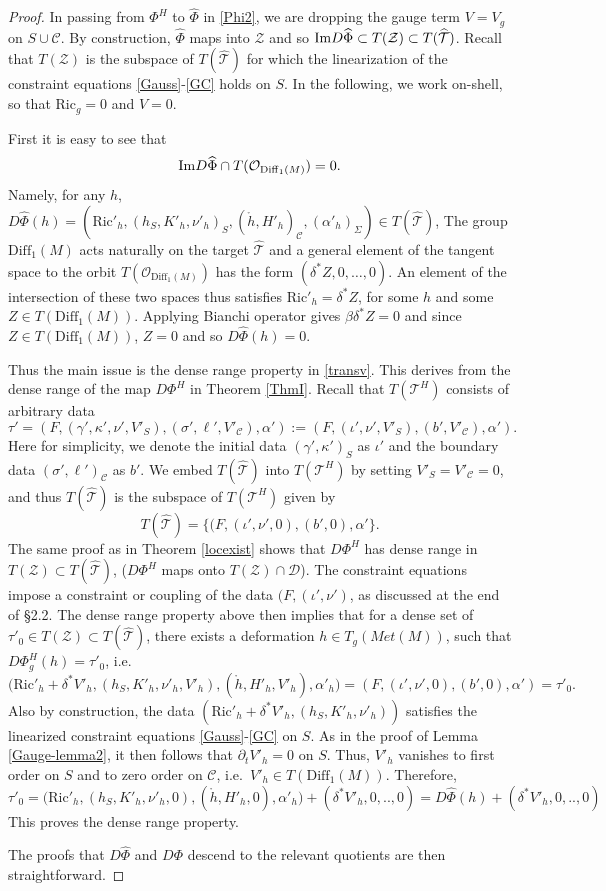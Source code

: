 \documentclass[10pt]{amsart}
\renewcommand{\a}{\alpha}
\renewcommand{\b}{\beta}
\newcommand{\g}{\gamma}
\renewcommand{\d}{\delta}
\newcommand{\s}{\sigma}
\newcommand{\Si}{\Sigma}
\renewcommand{\k}{\kappa}
\newcommand{\cO}{{\mathcal O}}
\newcommand{\cC}{{\mathcal C}}
\newcommand{\cT}{{\mathcal T}}
\newcommand{\cD}{{\mathcal D}}
\newcommand{\cZ}{\mathcal Z}
\newcommand{\Ric}{\mathrm{Ric}}
\newcommand{\Diff}{\mathrm{Diff}}
\newcommand{\bes}{\begin{equation*}}
\newcommand{\ees}{\end{equation*}}
\newcommand{\p}{\partial}
\renewcommand{\hat}{\widehat}
\newcommand{\<}{\langle}
\renewcommand{\>}{\rangle}
\theoremstyle{plain}
\theoremstyle{remark}
\theoremstyle{definition}
\numberwithin{equation}{section}
\begin{document}
\begin{proof}  

    In passing from $\Phi^H$ to $\hat \Phi$ in \eqref{Phi2}, we are dropping the gauge term $V = V_g$ on $S \cup \cC$. By construction, $\hat \Phi$ maps 
into $\cZ$ and so ${\rm Im}D\hat \Phi \subset T(\cZ) \subset T(\hat \cT)$. Recall that $T(\cZ)$ is the subspace of $T(\hat \cT)$ for which the 
linearization of the constraint equations \eqref{Gauss}-\eqref{GC} holds on $S$. In the following, we work on-shell, so that $\Ric_g = 0$ and $V = 0$. 

First it is easy to see that 
$${\rm Im}D\hat \Phi \cap T(\cO_{\Diff_1(M)}) = 0.$$
Namely, for any $h$, $D\hat \Phi(h) = (\Ric'_h, (h_S, K'_h, \nu'_h)_S, (\ring{h}, H'_h)_{\cC}, (\a'_h)_{\Si}) \in T(\hat \cT)$, The group 
$\Diff_1(M)$ acts naturally on the target $\hat \cT$ and a general element of the tangent space to the orbit $T(\cO_{\Diff_1(M)})$ has the form 
$(\d^*Z, 0, \dots, 0)$. An element of the intersection of these two spaces thus satisfies $\Ric'_h = \d^*Z$, for some $h$ and some 
$Z \in T(\Diff_1(M))$. Applying Bianchi operator gives $\b \d^*Z = 0$ and since $Z \in T(\Diff_1(M))$, $Z = 0$ and so $D\hat \Phi(h) = 0$. 

   Thus the main issue is the dense range property in \eqref{transv}. This derives from the dense range of the map $D\Phi^H$ in Theorem \ref{ThmI}.  
 Recall that $T(\cT^H)$ consists of arbitrary data 
$$\tau'= (F,(\g',\k',\nu',V'_S), (\s',\ell', V'_\cC), \a'):= (F,(\iota',\nu',V'_S), (b', V'_\cC), \a').$$
Here for simplicity, we denote the initial data $(\g',\k')_S$ as $\iota'$ and the boundary data $(\s',\ell')_\cC$ as $b'$. We embed $T(\hat \cT)$ into 
$T(\cT^H)$ by setting $V'_S=V'_\cC = 0$, and thus $T(\hat \cT)$ is the subspace of $T(\cT^H)$ given by 
$$T(\hat\cT) = \{ (F,(\iota',\nu',0), (b', 0), \a' \}.$$
The same proof as in Theorem \ref{locexist} shows that $D\Phi^H$ has dense range in $T(\cZ) \subset T(\hat \cT)$, ($D\Phi^H$ maps onto $T(\cZ) \cap \cD$). 
The constraint equations impose a constraint or coupling of the data $(F,(\iota',\nu')$, as discussed at the end of \S 2.2. The dense range property 
above then implies that for a dense set of $\tau'_0 \in T(\cZ) \subset T(\hat \cT)$, there exists a deformation $h \in T_g(Met(M))$, such that 
$D \Phi_g^H (h)= \tau'_0$, i.e.
$$\big(\Ric'_h + \d^*V'_h, (h_S,K'_h, \nu'_h, V'_h), (\ring{h}, H'_h, V'_h), \a'_h\big) = (F,(\iota',\nu',0), (b', 0), \a') = \tau'_0.$$
Also by construction, the data $(\Ric'_h + \d^*V'_h, (h_S, K'_h, \nu'_h))$ satisfies the linearized constraint equations \eqref{Gauss}-\eqref{GC} on $S$. 
As in the proof of Lemma \ref{Gauge-lemma2},  it then follows that $\p_t V'_h = 0$ on $S$. Thus, $V'_h$ vanishes to first order on $S$ and to zero order 
on $\cC$, i.e.~$V'_h \in T(\Diff_1(M))$. Therefore,
\bes
\tau'_0 = \big(\Ric'_h, (h_S,K'_h, \nu'_h,0), (\ring{h}, H'_h, 0), \a'_h\big)+(\d^*V'_h,0,..,0) = D\hat\Phi(h)+(\d^*V'_h,0,..,0)
\ees
This proves the dense range property. 

   The proofs that $D\hat \Phi$ and $D\Phi$ descend to the relevant quotients are then straightforward. 

 \end{proof}
\end{document}
